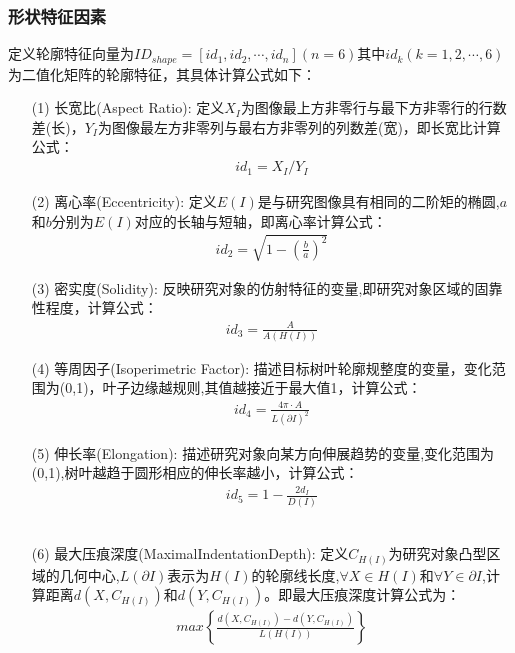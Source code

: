 \documentclass{whutmod}
\begin{document}
	    \subsubsection{形状特征因素}
		定义轮廓特征向量为$ID_{shape}=[id_{1},id_{2},\cdots,id_{n}](n=6)$其中$id_{k}(k=1,2,\cdots,6)$为二值化矩阵的轮廓特征，其具体计算公式如下：
		\begin{itemize}	
		\item [(1)]长宽比(Aspect Ratio):
		定义$X_{I}$为图像最上方非零行与最下方非零行的行数差(长)，$Y_{I}$为图像最左方非零列与最右方非零列的列数差(宽)，即长宽比计算公式：
		\begin{gather}
		id_{1}=X_{I}/Y_{I}
		\end{gather}

		
		\item [(2)]离心率(Eccentricity): 
		定义$E(I)$是与研究图像具有相同的二阶矩的椭圆,$a$和$b$分别为$E(I)$对应的长轴与短轴，即离心率计算公式：
		\begin{gather}
		id_{2}=\sqrt{1-(\frac{b}{a})^{2}}
		\end{gather}
		
		
		\item[(3)]密实度(Solidity):
		反映研究对象的仿射特征的变量,即研究对象区域的固靠性程度，计算公式：
		\begin{gather}
		id_{3}=\frac{ A }{A(H(I))}
		\end{gather}
		
		\item [(4)]等周因子(Isoperimetric Factor):
		描述目标树叶轮廓规整度的变量，变化范围为(0,1)，叶子边缘越规则,其值越接近于最大值1，计算公式：
		\begin{gather}
		id_{4}=\frac{4\pi \cdot  A}{L(\partial I)^{2}}
		\end{gather}
		
		\item [(5)]伸长率(Elongation): 
		描述研究对象向某方向伸展趋势的变量,变化范围为(0,1),树叶越趋于圆形相应的伸长率越小，计算公式：
		\begin{gather}
		id_{5}=1-\frac{2d_{I}}{D(I)}
		\end{gather}
		
		\item[(6)]最大压痕深度(MaximalIndentationDepth):
		定义$C_{H(I)}$为研究对象凸型区域的几何中心,$L(\partial I)$表示为$H(I)$的轮廓线长度,$\forall X\in H(I)$和$\forall Y\in \partial I$,计算距离$d(X,C_{H(I)})$和$d(Y,C_{H(I)})$。即最大压痕深度计算公式为：
		\begin{gather}
		max\left \{ \frac{ d(X,C_{H(I)})- d(Y,C_{H(I)})}{L(H(I))} \right \}
		\end{gather}
		

\end{itemize}
\end{document}
